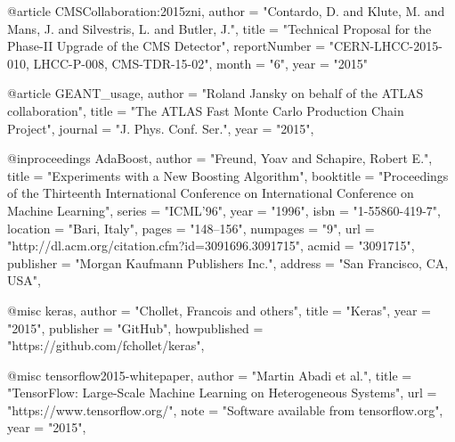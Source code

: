 @article{
	CMSCollaboration:2015zni,
    author  = "Contardo, D. and Klute, M. and Mans, J. and Silvestris, L. and Butler, J.",
    title   = "{Technical Proposal for the Phase-II Upgrade of the CMS Detector}",
    reportNumber    = "CERN-LHCC-2015-010, LHCC-P-008, CMS-TDR-15-02",
    month   = "6",
    year    = "2015"
}

@article{
	GEANT_usage,
    author  = "Roland Jansky on behalf of the ATLAS collaboration",
    title   = "The ATLAS Fast Monte Carlo Production Chain Project",
    journal = "J. Phys. Conf. Ser.",
    year    = "2015",
}

@inproceedings{
	AdaBoost,
    author  = "Freund, Yoav and Schapire, Robert E.",
    title   = "Experiments with a New Boosting Algorithm",
    booktitle   = "Proceedings of the Thirteenth International Conference on International Conference on Machine Learning",
    series  = "ICML'96",
    year    = "1996",
    isbn    = "1-55860-419-7",
    location    = "Bari, Italy",
    pages   = "148--156",
    numpages    = "9",
    url     = "http://dl.acm.org/citation.cfm?id=3091696.3091715",
    acmid   = "3091715",
    publisher   = "Morgan Kaufmann Publishers Inc.",
    address = "San Francisco, CA, USA",
} 

@misc{
	keras,
    author  = "Chollet, Francois and others",
    title   = "Keras",
    year    = "2015",
    publisher   = "GitHub",
    howpublished    = "https://github.com/fchollet/keras",
}

@misc{
	tensorflow2015-whitepaper,
    author  = "Martin Abadi et al.",
    title   = "TensorFlow: Large-Scale Machine Learning on Heterogeneous Systems",
    url     = "https://www.tensorflow.org/",
    note    = "Software available from tensorflow.org",
    year    = "2015",
}